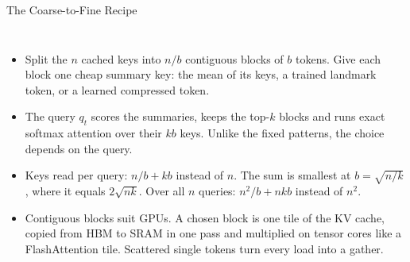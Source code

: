 \begin{frame}{The Coarse-to-Fine Recipe}
  \begin{columns}[T,onlytextwidth]
      \begin{itemize}\footnotesize\itemsep0.35em
        \item[\textcolor{red}{$\blacktriangleright$}] Split the $n$ cached keys into $n/b$ contiguous blocks of $b$ tokens. Give each block one cheap summary key: the mean of its keys, a trained landmark token, or a learned compressed token.
        \item[\textcolor{red}{$\blacktriangleright$}] The query $q_t$ scores the summaries, keeps the top-$k$ blocks and runs exact softmax attention over their $kb$ keys. Unlike the fixed patterns, the choice depends on the query.
        \item[\textcolor{red}{$\blacktriangleright$}] Keys read per query: $n/b + kb$ instead of $n$. The sum is smallest at $b = \sqrt{n/k}$, where it equals $2\sqrt{nk}$. Over all $n$ queries: $n^2/b + nkb$ instead of $n^2$.
        \item[\textcolor{red}{$\blacktriangleright$}] Contiguous blocks suit GPUs. A chosen block is one tile of the KV cache, copied from HBM to SRAM in one pass and multiplied on tensor cores like a FlashAttention tile. Scattered single tokens turn every load into a gather.
      \end{itemize}
      \centering
      \vspace{0.6em}
\end{columns}
\end{frame}
